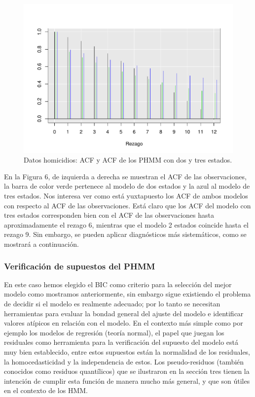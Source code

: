 \documentclass[a4paper]{article}\usepackage[]{graphicx}\usepackage[]{color}
\makeatletter
\def\maxwidth{ %
  \ifdim\Gin@nat@width>\linewidth
    \linewidth
  \else
    \Gin@nat@width
  \fi
}
\newenvironment{knitrout}{}{} %
\makeatother
\begin{document}
\begin{knitrout}
\color{fgcolor}\begin{figure}
\includegraphics[width=\maxwidth]{figure/unnamed-chunk-15-1} \caption[Datos homicidios]{Datos homicidios: ACF y ACF de los PHMM con dos y tres estados.}\label{fig:unnamed-chunk-15}
\end{figure}


\end{knitrout}

En la Figura 6, de izquierda a derecha se muestran el ACF de las observaciones, la barra de color verde pertenece al modelo de dos estados y la azul al modelo de tres estados. Nos interesa ver como está yuxtapuesto los ACF de ambos modelos con respecto al ACF de las observaciones. Está claro que los ACF del modelo con tres estados corresponden bien con el ACF de las observaciones hasta aproximadamente el rezago 6, mientras que el modelo 2 estados coincide hasta el rezago 9. Sin embargo, se pueden aplicar diagnósticos más sistemáticos, como se mostrará a continuación.

\clearpage

\subsubsection*{Verificación de supuestos del PHMM}

En este caso hemos elegido el BIC como criterio para la selección del mejor modelo como mostramos anteriormente, sin embargo sigue existiendo el problema de decidir si el modelo es realmente adecuado; por lo tanto se necesitan herramientas para evaluar la bondad general del ajuste del modelo e identificar valores atípicos en relación con el modelo. En el contexto más simple como por ejemplo los modelos de regresión (teoría normal), el papel que juegan los residuales como herramienta para la verificación del supuesto del modelo está muy bien establecido, entre estos supuestos están la normalidad de los residuales, la homocedasticidad y la independencia de estos. Los pseudo-residuos (también conocidos como residuos quantílicos) que se ilustraron en la sección tres tienen la intención de cumplir esta función de manera mucho más general, y que son útiles en el contexto de los HMM. 
\end{document}
